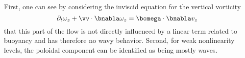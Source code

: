 
First, one can see by considering the inviscid equation for the
vertical vorticity
\begin{equation}
\partial_t \omega_z + \vv \cdot \bnabla \omega_z = \bomega \cdot \bnabla v_z
\end{equation}
that this part of the flow is not directly influenced by a linear term related
to buoyancy and has therefore no wavy behavior. Second, for weak nonlinearity
levels, the poloidal component can be identified as being mostly waves.
